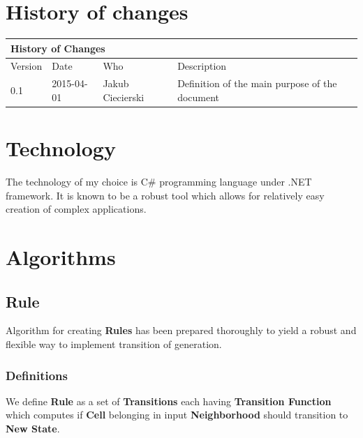 \documentclass{article}
\begin{document}
\section{History of changes}

	\begin{table}[h]
		\hspace*{-2.1cm}
		\large
		\begin{tabular}{|l|l|l|l|}
		\hline
		\multicolumn{4}{|l|}{\cellcolor[HTML]{C0C0C0}History of Changes} \\ \hline
		Version         & Date         & Who        & Description        \\ \hline
		0.1         & 2015-04-01         & Jakub Ciecierski        & Definition of the main purpose of the document       \\ \hline
		\end{tabular}
	\end{table}

\newpage




\section{Technology}

The technology of my choice is C\# programming language under .NET framework.
It is known to be a robust tool which allows for relatively easy creation
of complex applications.





\section{Algorithms}

\subsection{Rule}

Algorithm for creating {\bf Rules} has been prepared thoroughly to yield a robust and flexible
way to implement transition of generation.

\subsubsection{Definitions}

We define {\bf Rule} as a set of {\bf Transitions} each having {\bf Transition Function} 
which computes if {\bf Cell} 
belonging in input {\bf Neighborhood} should transition to {\bf New State}.
\end{document}
